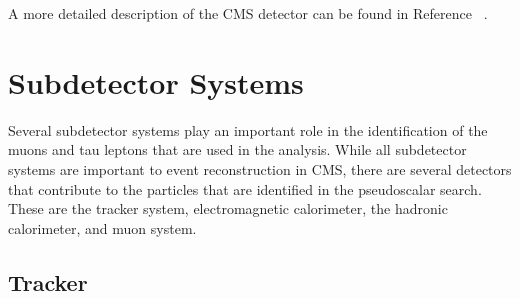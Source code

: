


A more detailed description of the CMS detector can be found in Reference ~\cite{Chatrchyan:2008zzk}.



\section{Subdetector Systems}
Several subdetector systems play an important role in the identification of the muons and tau leptons that are used in the analysis. 
While all subdetector systems are important to event reconstruction in CMS, there are several detectors that contribute to the particles that are identified in the pseudoscalar search. These are the tracker system, electromagnetic calorimeter, the hadronic calorimeter, and muon system. 

\subsection{Tracker}

